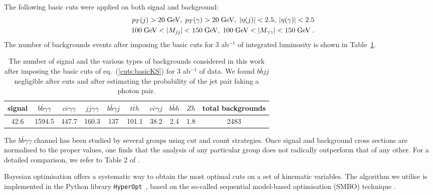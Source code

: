 The following basic cuts were applied on both signal and background:
%
\begin{eqnarray}
& & p_T(j) > 20\;\hbox{\ensuremath{\text{GeV}}},\; p_T(\gamma) > 20\;\hbox{\ensuremath{\text{GeV}}},\; |\eta(j)|<2.5,\; |\eta(\gamma)|<2.5 \nonumber \\
& & 100\;\hbox{\ensuremath{\text{GeV}}} < |M_{jj}| < 150\;\hbox{\ensuremath{\text{GeV}}},\; 100\;\hbox{\ensuremath{\text{GeV}}} < |M_{\gamma\gamma}| < 150\;\hbox{\ensuremath{\text{GeV}}}\; .
\label{cuts:basicKS} 
\end{eqnarray}
%
The number of backgrounds events after imposing the basic cuts for 3 ab$^{-1}$ of integrated luminosity is shown in Table~\ref{table:nevKS}.
%
\begin{table}[!h]
\centering
\begin{tabular}{c|c|c|c|c|c|c|c|c|c}
\hline\hline
signal & $b\bar{b}\gamma\gamma$ & $c\bar{c}\gamma\gamma$ & $jj\gamma\gamma$ & $b\bar{b}\gamma j$ & $t\bar{t}h$ & $c\bar{c}\gamma j$ &  $b\bar{b} h$ & $Zh$ & total backgrounds \\ 
\hline
42.6   & 1594.5  & 447.7   &  160.3 &   137 & 101.1  & 38.2  &  2.4    & 1.8 & 2483 \\
\hline\hline
\end{tabular}
\caption{The number of signal and the various types of backgrounds considered in this work after imposing the basic cuts of eq.~(\ref{cuts:basicKS}) for 3 ab$^{-1}$ of data. We found $b\bar{b} jj$ negligible after cuts and after estimating the probability of the jet pair faking a photon pair.}
\label{table:nevKS}
\end{table}


The $b\bar{b}\gamma\gamma$ channel has been studied by several groups using cut and count strategies. Once signal and background cross sections are normalised to the proper values, one finds that the analysis of any particular group does not radically outperform that of any other. For a detailed comparison, we refer to Table 2 of \cite{Alves:2017ued}. 

Bayesian optimisation  offers a systematic way to obtain the most optimal cuts on a set of kinematic variables. The algorithm we utilise is implemented in the Python library \texttt{HyperOpt}~, based on the so-called sequential model-based optimisation (SMBO) technique \cite{Bergstra1, Bergstra2, hyperopt}.

